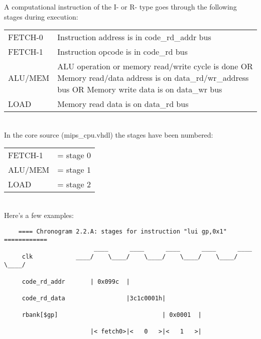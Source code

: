 \documentclass[11pt]{article}
\begin{document}
    A computational instruction of the I- or R- type goes through the following
    stages during execution:\\

    \begin{tabular}{ l l }
        FETCH-0   & Instruction address is in code\_rd\_addr bus\\
        FETCH-1   & Instruction opcode is in code\_rd bus\\
        ALU/MEM   & ALU operation or memory read/write cycle is done OR
                      Memory read/data address is on data\_rd/wr\_address bus OR
                      Memory write data is on data\_wr bus\\
        LOAD      & Memory read data is on data\_rd bus
    \end{tabular}\\        
    
    In the core source (mips\_cpu.vhdl) the stages have been numbered:\\
    
    \begin{tabular}{ l l }
        FETCH-1 & = stage 0\\
        ALU/MEM & = stage 1\\
        LOAD    & = stage 2
    \end{tabular}\\  
    
    Here's a few examples:\\

\begin{verbatim}
    ==== Chronogram 2.2.A: stages for instruction "lui gp,0x1" ============
                         ____      ____      ____      ____      ____
     clk            ____/    \____/    \____/    \____/    \____/    \____/

     code_rd_addr       | 0x099c  |                                        
     
     code_rd_data                 |3c1c0001h|

     rbank[$gp]                             | 0x0001  |
     
                        |< fetch0>|<   0   >|<   1   >|
\end{verbatim}\\
\end{document}

